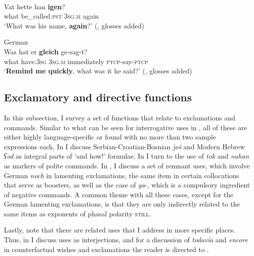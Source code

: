 \begin{exe}
	\ex {}\label{exRemindMeAgainSwedish}\\
	\gll Vat hette han \textbf{igen}?\\
	what be\_called.\textsc{pst} 3\textsc{sg}.\textsc{m} again\\
	\glt \lq What was his name, \textbf{again}?\rq{ }(\cite[399]{Vaelikangas1982}, glosses added)	

	\ex German\label{exRemindMeAgainGleich}\\
	\gll Was hat er \textbf{gleich} ge-sag-t?\\
	what have.3\textsc{sg} 3\textsc{sg}.\textsc{m} immediately \textsc{ptcp}-say-\textsc{ptcp}\\
	\glt \lq \textbf{Remind me quickly}, what was it he said?\rq{ }(\cite[s.v. \textit{gleich}]{Duden}, glosses added)
\end{exe}

\subsection{Exclamatory and directive functions}\label{sectionExclamatory}
In this subsection, I survey a set of functions that relate to exclamations and commands. Similar to what can be seen for interrogative uses in , all of these are either highly language-specific or found with no more than two sample expressions each. In  I discuss Serbian-Croatian-Bosnian \textit{još} and Modern Hebrew \textit{ʕod} as integral parts of \lq and how!\rq{ }formulae. In  I turn to the use of  \textit{tok} and  \textit{nahan} as markers of polite commands. In , I discuss a set of remnant uses, which involve German \textit{noch} in lamenting exclamations, the same item in certain collocations that serve as boosters,  as well as the case of  \mbox{\textit{ga}-}, which is a compulsory ingredient of negative commands. A common theme with all these cases, except for the German lamenting exclamations, is that they are only indirectly related to the same items as exponents of phasal polarity \textsc{still}.

Lastly, note that there are related uses that I address in more specific places. Thus, in  I discuss uses as   interjections, and for a discussion of   \textit{todavía} and  \textit{encore} in counterfactual wishes and exclamations the reader is directed to .

